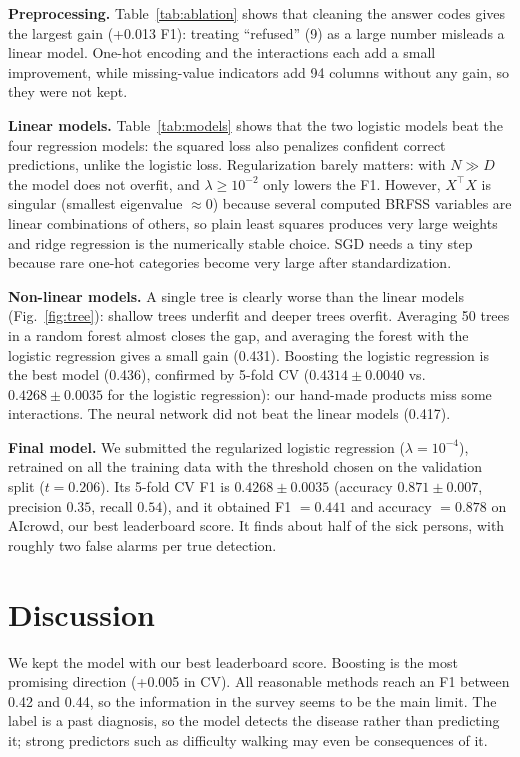 \documentclass[10pt,conference,compsocconf,onecolumn]{IEEEtran}
\begin{document}
\textbf{Preprocessing.} Table~\ref{tab:ablation} shows that cleaning the
answer codes gives the largest gain (+0.013 F1): treating ``refused'' (9)
as a large number misleads a linear model. One-hot encoding and the
interactions each add a small improvement, while missing-value indicators
add 94 columns without any gain, so they were not kept.

\textbf{Linear models.} Table~\ref{tab:models} shows that the two logistic
models beat the four regression models: the squared loss also penalizes
confident correct predictions, unlike the logistic loss. Regularization barely
matters: with $N \gg D$ the model does not overfit, and $\lambda \geq
10^{-2}$ only lowers the F1. However, $X^\top X$ is singular (smallest
eigenvalue $\approx 0$) because several computed BRFSS variables are linear
combinations of others, so plain least squares produces very large weights
and ridge regression is the numerically stable choice. SGD needs a tiny
step because rare one-hot categories become very large after
standardization.

\textbf{Non-linear models.} A single tree is clearly worse than the linear
models (Fig.~\ref{fig:tree}): shallow trees underfit and deeper trees
overfit. Averaging 50 trees in a random forest almost closes the gap, and
averaging the forest with the logistic regression gives a small gain
(0.431). Boosting the logistic regression is the best model (0.436), confirmed by
5-fold CV ($0.4314 \pm 0.0040$ vs.\ $0.4268 \pm 0.0035$ for the logistic
regression): our hand-made products miss some interactions. The neural
network did not beat the linear models (0.417).

\textbf{Final model.} We submitted the regularized logistic regression
($\lambda = 10^{-4}$), retrained on all the training data with the
threshold chosen on the validation split ($t = 0.206$). Its 5-fold CV F1 is
$0.4268 \pm 0.0035$ (accuracy $0.871 \pm 0.007$, precision $0.35$, recall
$0.54$), and it obtained F1 $= 0.441$ and accuracy $= 0.878$ on AIcrowd,
our best leaderboard score. It finds about half of the sick persons, with roughly two
false alarms per true detection.

\section{Discussion}

We kept the model with our best leaderboard score. Boosting is the
most promising direction (+0.005 in CV). All
reasonable methods reach an F1 between 0.42 and 0.44, so the information in
the survey seems to be the main limit. The label is a past diagnosis, so
the model detects the disease rather than predicting it; strong predictors
such as difficulty walking may even be consequences of it.
\end{document}
